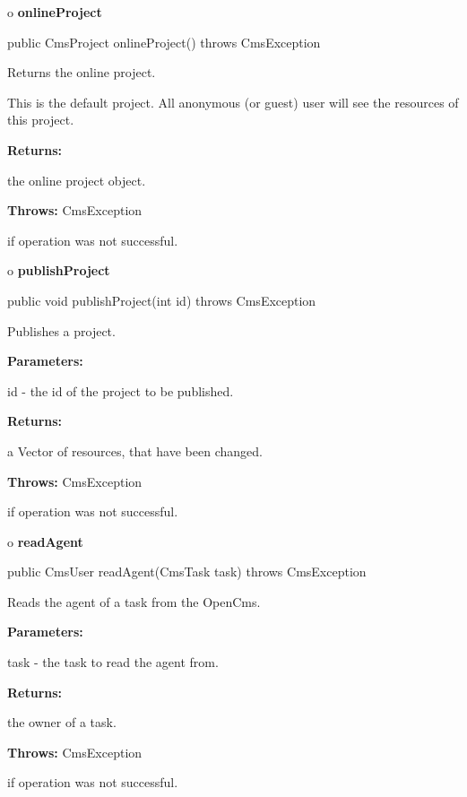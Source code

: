 o {\bf onlineProject} 

\begin{PRE}
 public CmsProject onlineProject() throws CmsException
\end{PRE}

\begin{description}
\htmlDD Returns the online project. 

This is the default project. All anonymous (or guest) user will see the
resources of this project. 

\begin{description}
\item {\bf Returns:}  

the online project object.  
\item {\bf Throws:} CmsException  

if operation was not successful.  
\end{description}

\end{description}

o {\bf publishProject} 

\begin{PRE}
 public void publishProject(int id) throws CmsException
\end{PRE}

\begin{description}
\htmlDD Publishes a project. 

\begin{description}
\item {\bf Parameters:}  

id - the id of the project to be published.  
\item {\bf Returns:}  

a Vector of resources, that have been changed.  
\item {\bf Throws:} CmsException  

if operation was not successful.  
\end{description}

\end{description}

o {\bf readAgent} 

\begin{PRE}
 public CmsUser readAgent(CmsTask task) throws CmsException
\end{PRE}

\begin{description}
\htmlDD Reads the agent of a task from the OpenCms. 

\begin{description}
\item {\bf Parameters:}  

task - the task to read the agent from.  
\item {\bf Returns:}  

the owner of a task.  
\item {\bf Throws:} CmsException  

if operation was not successful.  
\end{description}

\end{description}

